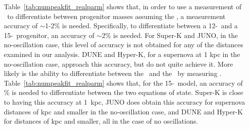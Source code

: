 Table~\ref{tab:numpeakfit_realparm} shows that, 
 in order to use a measurement of \lmax\ to 
differentiate between progenitor masses assuming the \ls, a
measurement accuracy of $\sim$1-2\% is needed.  Specifically, to
differentiate between a 12-\Msol\ and a 15-\Msol\ progenitor, an
accuracy of $\sim$2\% is needed.  For Super-K and JUNO, in the
 no-oscillation case, this level of
accuracy is not obtained for any of the distances examined in our
analysis.  DUNE and Hyper-K, for a supernova at 1 kpc in 
the no-oscillation case, 
approach this accuracy, but do not quite achieve it. 
More likely is the ability to
differentiate between the \ls\ and the \shen\ by measuring \lmax.
Table~\ref{tab:numpeakfit_realparm} shows that, for the
15-\Msol\ model, an accuracy of \% is needed to differentiate
between the two equations of state.  Super-K is close to having this
 accuracy at 1~kpc, JUNO does
obtain this accuracy for supernova distances of  kpc and smaller
 in the no-oscillation case, and 
DUNE and Hyper-K for distances of  kpc and smaller, 
all in the case of no oscillations.  




